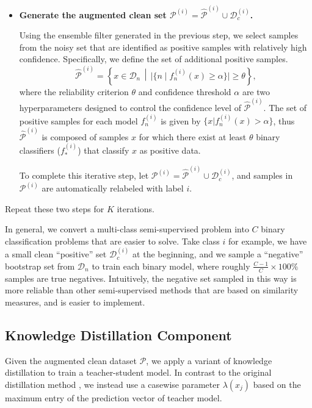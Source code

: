 \documentclass[conference]{IEEEtran}
\begin{document}
\begin{itemize}
\item \textbf{Generate the augmented clean set $\mathcal{P}^{(i)}=\hat{\mathcal{P}}^{(i)}\cup\mathcal{D}_c^{(i)}$.}

Using the ensemble filter generated in the previous step, we select samples from the noisy set that are identified as positive samples with relatively high confidence. 
Specifically, we define the set of additional positive samples. 
\begin{equation}
\hat{\mathcal{P}}^{(i)}=\left\{x\in\mathcal{D}_n
\,\middle\vert\, 
 \vert \{n \mid f^{(i)}_n(x)\geq\alpha \} \vert \geq \theta \right\},
\end{equation}
where the reliability criterion $\theta$ and confidence threshold $\alpha$ are two hyperparameters designed to control the confidence level of $\hat{\mathcal{P}}^{(i)}$. 
The set of positive samples for each model $f^{(i)}_n$ is given by $\{x \vert f^{(i)}_n(x)>\alpha\}$, thus $\hat{\mathcal{P}}^{(i)}$ is composed of samples $x$ for which there exist at least $\theta$ binary classifiers ($f^{(i)}_\ast$) that classify $x$ as positive data. 

To complete this iterative step, let $\mathcal{P}^{(i)} = \hat{\mathcal{P}}^{(i)} \cup \mathcal{D}_c^{(i)}$, and samples in $\mathcal{P}^{(i)}$ are automatically relabeled with label $i$.
\end{itemize}
Repeat these two steps for $K$ iterations. 

In general, we convert a multi-class semi-supervised problem into $C$ binary classification problems that are easier to solve. Take class $i$ for example, we have a small clean “positive” set $\mathcal{D}_c^(i)$ at the beginning, and we sample a “negative” bootstrap set from $\mathcal{D}_n$ to train each binary model, where roughly $\frac{C-1}{C}\times 100\%$ samples are true negatives. Intuitively, the negative set sampled in this way is more reliable than other semi-supervised methods that are based on similarity measures, and is easier to implement.






\subsection{Knowledge Distillation Component}
Given the augmented clean dataset $\mathcal{P}$, we apply a variant of knowledge distillation to train a teacher-student model.
In contrast to the original distillation method \cite{hinton2015distilling, li2017learning}, we instead use a casewise parameter $\lambda(x_j)$ based on the maximum entry of the prediction vector of teacher model.
\end{document}
